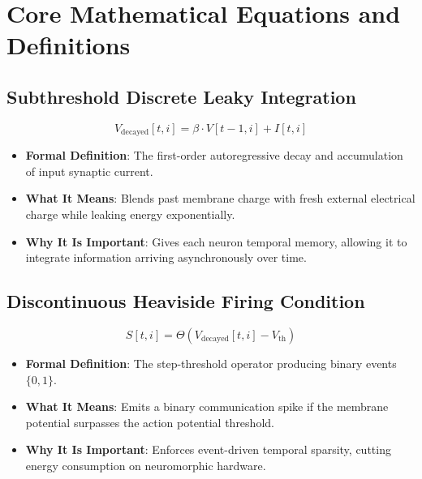 \documentclass[11pt,a4paper]{article}
\theoremstyle{definition}
\begin{document}
\section{Core Mathematical Equations and Definitions}

\subsection{Subthreshold Discrete Leaky Integration}
{\boldmath
\begin{equation}
V_{\text{decayed}}[t, i] = \beta \cdot V[t-1, i] + I[t, i]
\end{equation}
}
\begin{itemize}
    \item \textbf{Formal Definition}: The first-order autoregressive decay and accumulation of input synaptic current.
    \item \textbf{What It Means}: Blends past membrane charge with fresh external electrical charge while leaking energy exponentially.
    \item \textbf{Why It Is Important}: Gives each neuron temporal memory, allowing it to integrate information arriving asynchronously over time.
\end{itemize}

\subsection{Discontinuous Heaviside Firing Condition}
{\boldmath
\begin{equation}
S[t, i] = \Theta(V_{\text{decayed}}[t, i] - V_{\text{th}})
\end{equation}
}
\begin{itemize}
    \item \textbf{Formal Definition}: The step-threshold operator producing binary events $\{0, 1\}$.
    \item \textbf{What It Means}: Emits a binary communication spike if the membrane potential surpasses the action potential threshold.
    \item \textbf{Why It Is Important}: Enforces event-driven temporal sparsity, cutting energy consumption on neuromorphic hardware.
\end{itemize}
\end{document}

